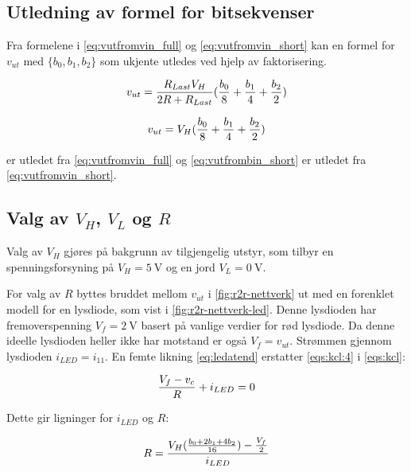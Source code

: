 \documentclass[11pt,a4paper,twocolumn]{article}
\begin{document}
\subsection{Utledning av formel for bitsekvenser}
Fra formelene i \cref{eq:vutfromvin_full} og \cref{eq:vutfromvin_short} kan en formel for $v_{ut}$ med $\{b_0, b_1, b_2\}$ som ukjente utledes ved hjelp av faktorisering.

\begin{equation}
v_{ut} = \frac{R_{Last}V_H}{2R + R_{Last}}(\frac{b_0}{8} + \frac{b_1}{4} + \frac{b_2}{2})\\
\label{eq:vutfrombin_full}
\end{equation}

\begin{equation}
v_{ut} = V_H(\frac{b_0}{8} + \frac{b_1}{4} + \frac{b_2}{2})\\
\label{eq:vutfrombin_short}
\end{equation}

 er utledet fra \cref{eq:vutfromvin_full} og \cref{eq:vutfrombin_short} er utledet fra \cref{eq:vutfromvin_short}.

\subsection{Valg av $V_H$, $V_L$ og $R$}
Valg av $V_H$ gjøres på bakgrunn av tilgjengelig utstyr, som tilbyr en spenningsforsyning på $V_H = \qty{5}{\volt}$ og en jord $V_L = \qty{0}{\volt}$.

\medskip

For valg av $R$ byttes bruddet mellom $v_{ut}$ i \cref{fig:r2r-nettverk} ut med en forenklet modell for en lysdiode, som vist i \cref{fig:r2r-nettverk-led}. Denne lysdioden har fremoverspenning $V_f = \qty{2}{\volt}$ basert på vanlige verdier \cite{analogtech} for rød lysdiode. Da denne ideelle lysdioden heller ikke har motstand er også $V_f = v_{ut}$. Strømmen gjennom lysdioden $i_{LED} = i_{11}$. En femte likning \cref{eq:ledatend} erstatter \cref{eqs:kcl:4} i \cref{eqs:kcl}:

\begin{equation}
\label{eq:ledatend}
\frac{V_f - v_c}{R} + i_{LED} = 0\\
\end{equation}

Dette gir ligninger for $i_{LED}$ og $R$:

\begin{equation}
\label{eq:forledR}
R = \frac{V_H(\frac{b_0 + 2b_1 + 4b_2}{16}) - \frac{V_f}{2}}{i_{LED}} \\
\end{equation}
\end{document}
